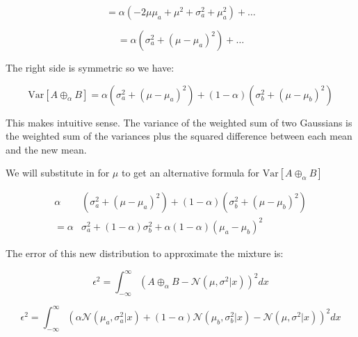 \documentclass{article}
\newcommand{\Var}{\mathrm{Var}}
\begin{document}
\begin{equation}
     = \alpha \left( -2 \mu \mu_a + \mu^2 + \sigma_a^2 + \mu_a^2 \right) + \ldots
\end{equation}

\begin{equation}
     = \alpha \left( \sigma_a^2 + \left(\mu - \mu_a \right)^2  \right) + \ldots
\end{equation}

The right side is symmetric so we have:

\begin{equation}
    \Var\left[A\oplus_\alpha B \right] = \alpha \left( \sigma_a^2 + \left( \mu - \mu_a \right)^2 \right ) + (1-\alpha)\left( \sigma_b^2 + \left( \mu - \mu_b \right)^2 \right)
\end{equation}

This makes intuitive sense.  The variance of the weighted sum of two Gaussians is the weighted sum of the variances plus the squared difference between each mean and the new mean. \par

We will substitute in for $\mu$ to get an alternative formula for $\Var\left[ A \oplus_\alpha B \right]$ 

\begin{equation}
\begin{aligned}
      \alpha & \left( \sigma_a^2 + \left(\mu - \mu_a \right)^2 \right ) + (1-\alpha)\left( \sigma_b^2 + \left( \mu - \mu_b \right)^2 \right) \\
    = \alpha & \sigma_a^2 + (1-\alpha)\sigma_b^2 + \alpha (1-\alpha)(\mu_a-\mu_b)^2
\end{aligned}
\end{equation}

The error of this new distribution to approximate the mixture is:

\begin{equation}
    \epsilon^2 = \int_{-\infty}^{\infty} \left( A \oplus_\alpha B - \mathcal{N}(\mu, \sigma^2|x) \right)^2 dx
\end{equation}

\begin{equation}
    \epsilon^2 = \int_{-\infty}^{\infty} \left( \alpha \mathcal{N}(\mu_a, \sigma_a^2|x) + (1-\alpha)\mathcal{N}(\mu_b, \sigma_b^2|x) - \mathcal{N}(\mu, \sigma^2|x) \right)^2 dx
\end{equation}
\end{document}
